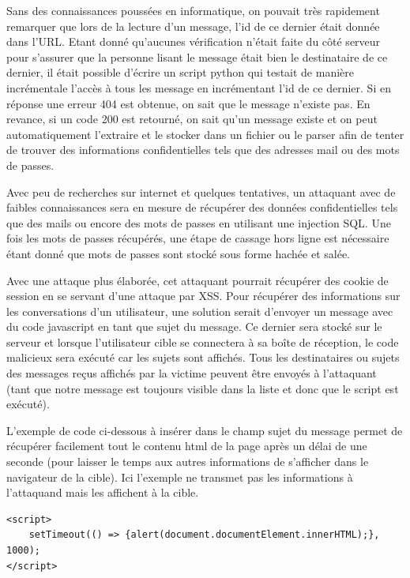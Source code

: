 \documentclass[12pt]{article}
\begin{document}
Sans des connaissances poussées en informatique, on pouvait très rapidement remarquer que lors de la lecture d'un message, l'id de ce dernier était donnée dans l'URL. Etant donné qu'aucunes vérification n'était faite du côté serveur pour s'assurer que la personne lisant le message était bien le destinataire de ce dernier, il était possible d'écrire un script python qui testait de manière incrémentale l'accès à tous les message en incrémentant l'id de ce dernier. Si en réponse une erreur 404 est obtenue, on sait que le message n'existe pas. En revance, si un code 200 est retourné, on sait qu'un message existe et on peut automatiquement l'extraire et le stocker dans un fichier ou le parser afin de tenter de trouver des informations confidentielles tels que des adresses mail ou des mots de passes.

Avec peu de recherches sur internet et quelques tentatives, un attaquant avec de faibles connaissances sera en mesure de récupérer des données confidentielles tels que des mails ou encore des mots de passes en utilisant une injection SQL. Une fois les mots de passes récupérés, une étape de cassage hors ligne est nécessaire étant donné que mots de passes sont stocké sous forme hachée et salée.

Avec une attaque plus élaborée, cet attaquant pourrait récupérer des cookie de session en se servant d'une attaque par XSS. Pour récupérer des informations sur les conversations d'un utilisateur, une solution serait d'envoyer un message avec du code javascript en tant que sujet du message. Ce dernier sera stocké sur le serveur et lorsque l'utilisateur cible se connectera à sa boîte de réception, le code malicieux sera exécuté car les sujets sont affichés. Tous les destinataires ou sujets des messages reçus affichés par la victime peuvent être envoyés à l'attaquant (tant que notre message est toujours visible dans la liste et donc que le script est exécuté).

L'exemple de code ci-dessous à insérer dans le champ sujet du message permet de récupérer facilement tout le contenu html de la page après un délai de une seconde (pour laisser le temps aux autres informations de s'afficher dans le navigateur de la cible). Ici l'exemple ne transmet pas les informations à l'attaquand mais les affichent à la cible. 

\begin{lstlisting}[style=JAVA]
<script>
	setTimeout(() => {alert(document.documentElement.innerHTML);}, 1000);
</script>
\end{lstlisting}
\end{document}
